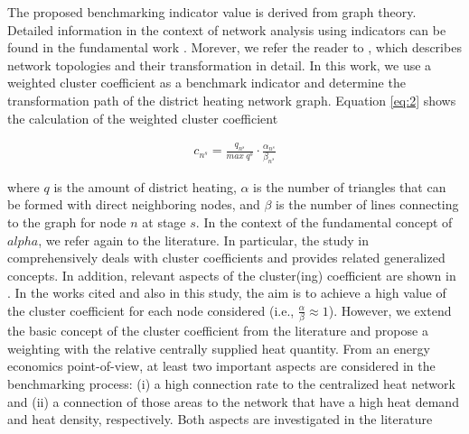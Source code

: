 The proposed benchmarking indicator value is derived from graph theory. Detailed information in the context of network analysis using indicators can be found in the fundamental work . Morever, we refer the reader to  \cite{sanfeliu1983distance}, which describes network topologies and their transformation in detail. In this work, we use a weighted cluster coefficient as a benchmark indicator and determine the transformation path of the district heating network graph. Equation \ref{eq:2} shows the calculation of the weighted cluster coefficient

\begin{align}\label{eq:2}
c_{n^{s}}=\frac{q_{n^{s}}}{max~q^{s}}\cdot \frac{\alpha_{n^{s}}}{\beta_{n^{s}}}
\end{align}

where $q$ is the amount of district heating, $\alpha$ is the number of triangles that can be formed with direct neighboring nodes, and $\beta$ is the number of lines connecting to the graph for node $n$ at stage $s$. In the context of the fundamental concept of $alpha$, we refer again to the literature. In particular, the study in \cite{huang2010link} comprehensively deals with cluster coefficients and provides related generalized concepts. In addition, relevant aspects of the cluster(ing) coefficient are shown in \cite{cui2014detecting}. In the works cited and also in this study, the aim is to achieve a high value of the cluster coefficient for each node considered (i.e., $\frac{\alpha}{\beta} \approx 1$). However, we extend the basic concept of the cluster coefficient from the literature and propose a weighting with the relative centrally supplied heat quantity. From an energy economics point-of-view, at least two important aspects are considered in the benchmarking process: (i) a high connection rate to the centralized heat network and (ii) a connection of those areas to the network that have a high heat demand and heat density, respectively. Both aspects are investigated in the literature 

